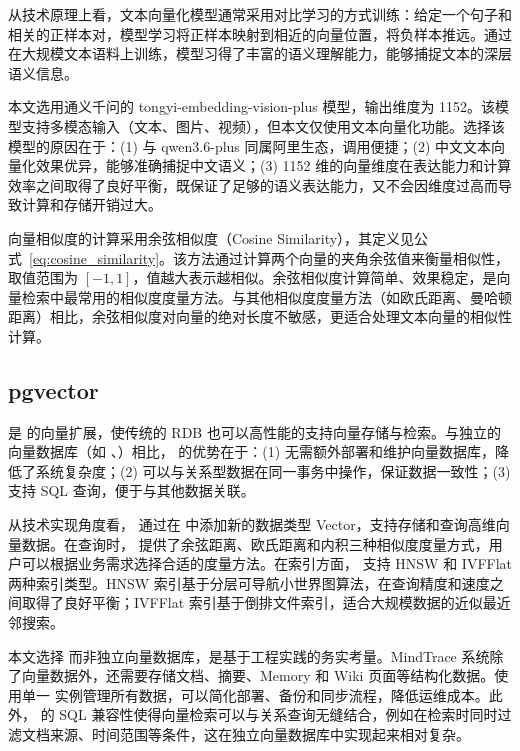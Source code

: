 从技术原理上看，文本向量化模型通常采用对比学习的方式训练：给定一个句子和相关的正样本对，模型学习将正样本映射到相近的向量位置，将负样本推远。通过在大规模文本语料上训练，模型习得了丰富的语义理解能力，能够捕捉文本的深层语义信息。

本文选用通义千问的 tongyi-embedding-vision-plus 模型，输出维度为 1152。该模型支持多模态输入（文本、图片、视频），但本文仅使用文本向量化功能。选择该模型的原因在于：(1) 与 qwen3.6-plus 同属阿里生态，调用便捷；(2) 中文文本向量化效果优异，能够准确捕捉中文语义；(3) 1152 维的向量维度在表达能力和计算效率之间取得了良好平衡，既保证了足够的语义表达能力，又不会因维度过高而导致计算和存储开销过大。

向量相似度的计算采用余弦相似度（Cosine Similarity），其定义见公式~\eqref{eq:cosine_similarity}。该方法通过计算两个向量的夹角余弦值来衡量相似性，取值范围为 $[-1, 1]$，值越大表示越相似。余弦相似度计算简单、效果稳定，是向量检索中最常用的相似度度量方法。与其他相似度度量方法（如欧氏距离、曼哈顿距离）相比，余弦相似度对向量的绝对长度不敏感，更适合处理文本向量的相似性计算。

\subsection{pgvector}

 是  的向量扩展，使传统的 RDB 也可以高性能的支持向量存储与检索。与独立的向量数据库（如 、）相比， 的优势在于：(1) 无需额外部署和维护向量数据库，降低了系统复杂度；(2) 可以与关系型数据在同一事务中操作，保证数据一致性；(3) 支持 SQL 查询，便于与其他数据关联。

从技术实现角度看， 通过在  中添加新的数据类型 Vector，支持存储和查询高维向量数据。在查询时， 提供了余弦距离、欧氏距离和内积三种相似度度量方式，用户可以根据业务需求选择合适的度量方法。在索引方面， 支持 HNSW 和 IVFFlat 两种索引类型。HNSW 索引基于分层可导航小世界图算法，在查询精度和速度之间取得了良好平衡；IVFFlat 索引基于倒排文件索引，适合大规模数据的近似最近邻搜索。

本文选择  而非独立向量数据库，是基于工程实践的务实考量。MindTrace 系统除了向量数据外，还需要存储文档、摘要、Memory 和 Wiki 页面等结构化数据。使用单一  实例管理所有数据，可以简化部署、备份和同步流程，降低运维成本。此外， 的 SQL 兼容性使得向量检索可以与关系查询无缝结合，例如在检索时同时过滤文档来源、时间范围等条件，这在独立向量数据库中实现起来相对复杂。

